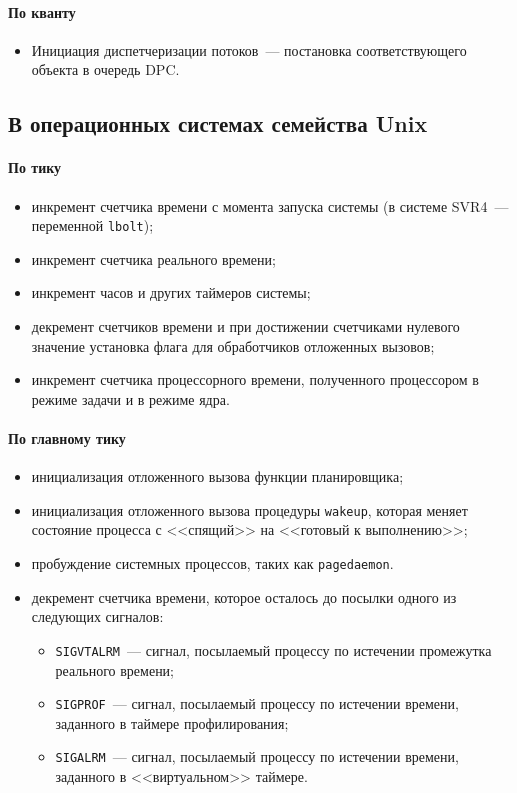 \documentclass[14pt]{extarticle}
\begin{document}
\paragraph{По кванту}
\begin{itemize}
    \item Инициация диспетчеризации потоков~--- постановка соответствующего
        объекта в очередь DPC.
\end{itemize}

\subsection{В операционных системах семейства Unix}

\paragraph{По тику}
\begin{itemize}
    \item инкремент счетчика времени с момента запуска системы (в системе
        SVR4~--- переменной \texttt{lbolt});
    \item инкремент счетчика реального времени;
    \item инкремент часов и других таймеров системы;
    \item декремент счетчиков времени и при достижении счетчиками нулевого
        значение установка флага для обработчиков отложенных вызовов;
    \item инкремент счетчика процессорного времени, полученного процессором в
        режиме задачи и в режиме ядра.
\end{itemize}

\paragraph{По главному тику}
\begin{itemize}
    \item инициализация отложенного вызова функции планировщика;
    \item инициализация отложенного вызова процедуры \texttt{wakeup}, которая
        меняет состояние процесса с <<спящий>> на <<готовый к выполнению>>;
    \item пробуждение системных процессов, таких как \texttt{pagedaemon}.
    \item декремент счетчика времени, которое осталось до посылки одного из
        следующих сигналов:
    \begin{itemize}
        \item \texttt{SIGVTALRM}~--- сигнал, посылаемый процессу по истечении
            промежутка реального времени;
        \item \texttt{SIGPROF}~--- сигнал, посылаемый процессу по истечении
            времени, заданного в таймере профилирования;
        \item \texttt{SIGALRM}~--- сигнал, посылаемый процессу по истечении
            времени, заданного в <<виртуальном>> таймере.
    \end{itemize}
\end{itemize}
\end{document}
